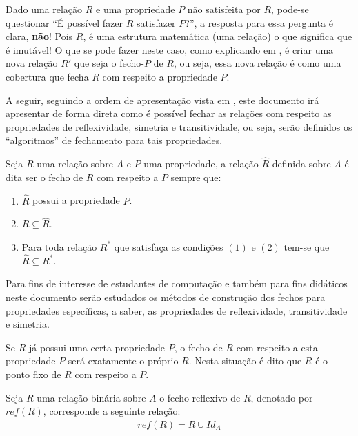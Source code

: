 Dado uma relação $R$ e uma propriedade $P$ não satisfeita por $R$,  pode-se questionar ``É possível fazer $R$ satisfazer  $P$?'', a resposta para essa pergunta é clara, \textbf{não}! Pois $R$, é uma estrutura matemática (uma relação) o que significa que é imutável! O que se pode fazer neste caso, como explicando em \cite{judith2021}, é criar uma nova relação $R'$ que seja o fecho-$P$ de $R$, ou seja, essa nova relação é como uma cobertura que fecha $R$ com respeito a propriedade $P$. 

A seguir, seguindo a ordem de apresentação vista em \cite{Gerard2021discreta}, este documento irá apresentar de forma direta como é possível fechar as relações com respeito as propriedades de reflexividade, simetria e transitividade, ou seja, serão definidos os ``algoritmos'' de fechamento para tais propriedades.

\begin{definicao}
	Seja $R$ uma relação sobre $A$ e $P$ uma propriedade, a relação $\widehat{R}$ definida sobre $A$ é dita ser o fecho de $R$ com respeito a $P$ sempre que:
	\begin{enumerate}
		\item $\widehat{R}$ possui a propriedade $P$.
		\item $R \subseteq \widehat{R}$.
		\item Para toda relação $R^*$ que satisfaça as condições $(1)$ e $(2)$ tem-se que $\widehat{R} \subseteq R^*$. 
	\end{enumerate}
\end{definicao}

Para fins de interesse de estudantes de computação e também para fins didáticos neste documento serão estudados os métodos de construção dos fechos para propriedades específicas, a saber, as propriedades de reflexividade, transitividade e simetria. 

\begin{atencao}
	Se $R$ já possui uma certa propriedade $P$, o fecho de $R$ com respeito a esta propriedade $P$ será exatamente o próprio $R$. Nesta situação é dito que $R$ é o ponto fixo de $R$ com respeito a $P$.
\end{atencao}

\begin{definicao}\label{def:FechoReflexivo}
	Seja $R$ uma relação binária sobre $A$ o fecho reflexivo de $R$, denotado por $ref(R)$, corresponde a seguinte relação:
	\begin{eqnarray*}
		ref(R) = R \cup Id_A
	\end{eqnarray*}
\end{definicao}

